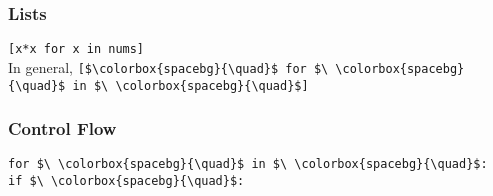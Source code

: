 \documentclass[12pt]{article}
\begin{document}
	\subsubsection*{Lists}
	
	\colorbox{codebg}{\lstinline|[x*x for x in nums]|} \\
	
	In general, \colorbox{codebg}{\lstinline|[$\colorbox{spacebg}{\quad}$ for $\ \colorbox{spacebg}{\quad}$ in $\ \colorbox{spacebg}{\quad}$]|}
	
	\subsubsection*{Control Flow}
	
	\colorbox{codebg}{\lstinline|for $\ \colorbox{spacebg}{\quad}$ in $\ \colorbox{spacebg}{\quad}$:|} \\
	
	\colorbox{codebg}{\lstinline|if $\ \colorbox{spacebg}{\quad}$:|}
	
\end{document}
